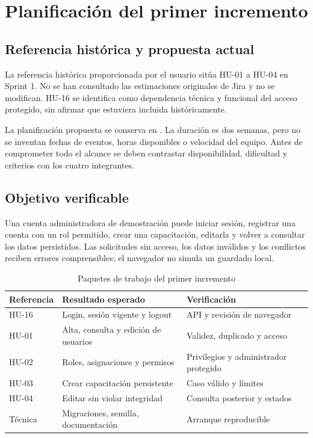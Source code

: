 \chapter{Planificación del primer incremento}
\section{Referencia histórica y propuesta actual}
La referencia histórica proporcionada por el usuario sitúa HU-01 a HU-04 en Sprint 1. No se han consultado las estimaciones originales de Jira y no se modifican. HU-16 se identifica como dependencia técnica y funcional del acceso protegido, sin afirmar que estuviera incluida históricamente.

La planificación propuesta se conserva en . La duración es dos semanas, pero no se inventan fechas de eventos, horas disponibles o velocidad del equipo. Antes de comprometer todo el alcance se deben contrastar disponibilidad, dificultad y criterios con los cuatro integrantes.

\section{Objetivo verificable}
Una cuenta administradora de demostración puede iniciar sesión, registrar una cuenta con un rol permitido, crear una capacitación, editarla y volver a consultar los datos persistidos. Las solicitudes sin acceso, los datos inválidos y los conflictos reciben errores comprensibles; el navegador no simula un guardado local.

\begin{table}[htbp]
\centering
\caption{Paquetes de trabajo del primer incremento}
\begin{tabular}{P{2cm}P{7cm}P{3cm}}
\toprule Referencia & Resultado esperado & Verificación \\ \midrule
HU-16 & Login, sesión vigente y logout & API y revisión de navegador \\
HU-01 & Alta, consulta y edición de usuarios & Validez, duplicado y acceso \\
HU-02 & Roles, asignaciones y permisos & Privilegios y administrador protegido \\
HU-03 & Crear capacitación persistente & Caso válido y límites \\
HU-04 & Editar sin violar integridad & Consulta posterior y estados \\
Técnica & Migraciones, semilla, documentación & Arranque reproducible \\
\bottomrule
\end{tabular}
\end{table}

